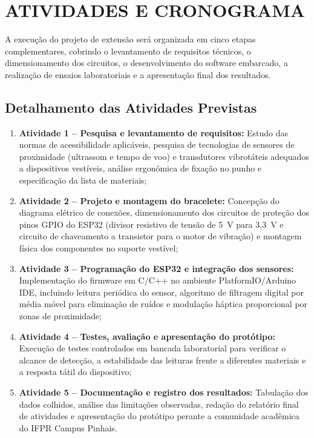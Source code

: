 \chapter{ATIVIDADES E CRONOGRAMA}
\label{capitulo-cronograma-proposta}

A execução do projeto de extensão será organizada em cinco etapas complementares, cobrindo o levantamento de requisitos técnicos, o dimensionamento dos circuitos, o desenvolvimento do software embarcado, a realização de ensaios laboratoriais e a apresentação final dos resultados.

\section{Detalhamento das Atividades Previstas}
\label{sec:detalhamento-atividades-proposta}

\begin{enumerate}
    \item \textbf{Atividade 1 -- Pesquisa e levantamento de requisitos:} Estudo das normas de acessibilidade aplicáveis, pesquisa de tecnologias de sensores de proximidade (ultrassom e tempo de voo) e transdutores vibrotáteis adequados a dispositivos vestíveis, análise ergonômica de fixação no punho e especificação da lista de materiais;
    \item \textbf{Atividade 2 -- Projeto e montagem do bracelete:} Concepção do diagrama elétrico de conexões, dimensionamento dos circuitos de proteção dos pinos GPIO do ESP32 (divisor resistivo de tensão de 5~V para 3,3~V e circuito de chaveamento a transistor para o motor de vibração) e montagem física dos componentes no suporte vestível;
    \item \textbf{Atividade 3 -- Programação do ESP32 e integração dos sensores:} Implementação do firmware em C/C++ no ambiente PlatformIO/Arduino IDE, incluindo leitura periódica do sensor, algoritmo de filtragem digital por média móvel para eliminação de ruídos e modulação háptica proporcional por zonas de proximidade;
    \item \textbf{Atividade 4 -- Testes, avaliação e apresentação do protótipo:} Execução de testes controlados em bancada laboratorial para verificar o alcance de detecção, a estabilidade das leituras frente a diferentes materiais e a resposta tátil do dispositivo;
    \item \textbf{Atividade 5 -- Documentação e registro dos resultados:} Tabulação dos dados colhidos, análise das limitações observadas, redação do relatório final de atividades e apresentação do protótipo perante a comunidade acadêmica do IFPR Campus Pinhais.
\end{enumerate}

